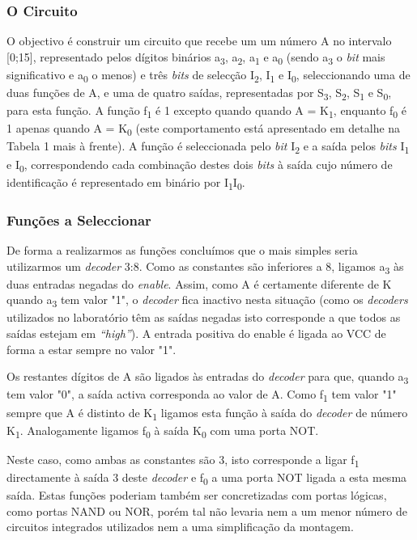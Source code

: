 \documentclass[a4paper,12pt]{article}
\begin{document}
\subsubsection{O Circuito}
O objectivo é construir um circuito que recebe um um número A no intervalo 
[0;15], representado pelos dígitos binários a\textsubscript{3}, 
a\textsubscript{2}, a\textsubscript{1} e a\textsubscript{0} (sendo 
a\textsubscript{3} o {\it bit} mais significativo e a\textsubscript{0} o menos) 
e três {\it bits} de selecção I\textsubscript{2}, I\textsubscript{1} e 
I\textsubscript{0}, seleccionando uma de duas funções de A, e uma de quatro 
saídas, representadas por S\textsubscript{3}, S\textsubscript{2}, 
S\textsubscript{1} e S\textsubscript{0}, para esta função. A função 
f\textsubscript{1} é 1 excepto quando quando A = K\textsubscript{1}, enquanto 
f\textsubscript{0} é 1 apenas quando A = K\textsubscript{0} (este 
comportamento está apresentado em detalhe na Tabela 1 mais à frente). A 
função é seleccionada pelo {\it bit} I\textsubscript{2} e a saída pelos 
{\it bits} I\textsubscript{1} e I\textsubscript{0}, correspondendo cada 
combinação destes dois {\it bits} à saída cujo número de identificação 
é representado em binário por I\textsubscript{1}I\textsubscript{0}.
\par
\subsubsection{Funções a Seleccionar}
De forma a realizarmos as funções concluímos que o mais simples seria 
utilizarmos um {\it decoder} 3:8. Como as constantes são inferiores a 8, 
ligamos a\textsubscript{3} às duas entradas negadas do {\it enable}. Assim, 
como A é certamente diferente de K quando a\textsubscript{3} tem valor "1", o 
{\it decoder} fica inactivo nesta situação (como os {\it decoders} utilizados 
no laboratório têm as saídas negadas isto corresponde a que todos as saídas 
estejam em {\it ``high''}). A entrada positiva do enable é ligada ao VCC de 
forma a estar sempre no valor "1". 
\par
Os restantes dígitos de A são ligados às entradas do {\it decoder} para que, 
quando a\textsubscript{3} tem valor "0", a saída activa corresponda ao valor 
de A. Como f\textsubscript{1} tem valor "1" sempre que A é distinto de 
K\textsubscript{1} ligamos esta função à saída do {\it decoder} de número 
K\textsubscript{1}. Analogamente ligamos f\textsubscript{0} à saída 
K\textsubscript{0} com uma porta NOT.
\par
Neste caso, como ambas as constantes são 3, isto corresponde a ligar 
f\textsubscript{1} directamente à saída 3 deste {\it decoder} e 
f\textsubscript{0} a uma porta NOT ligada a esta mesma saída. Estas funções 
poderiam também ser concretizadas com portas lógicas, como portas NAND ou 
NOR, porém tal não levaria nem a um menor número de circuitos integrados 
utilizados nem a uma simplificação da montagem.
\par
\end{document}

